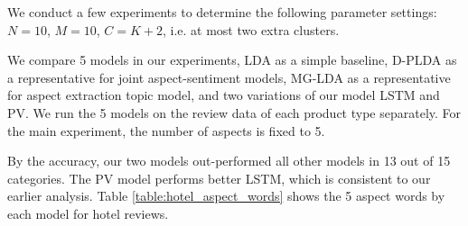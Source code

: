 \documentclass[10pt,final,conference,letterpaper]{IEEEtran}
\newcommand{\figref}[1]{Figure \ref{#1}}
\newcommand{\tabref}[1]{Table \ref{#1}}
\begin{document}
%
%
%
%
We conduct a few experiments to determine the following
parameter settings: $N=10$, $M=10$, $C=K+2$, i.e. at most two extra clusters.

We compare 5 models in our experiments, 
LDA as a simple baseline, 
D-PLDA \cite{moghaddam2012design} as a representative for joint 
aspect-sentiment models, MG-LDA \cite{titov2008modeling} as 
a representative for aspect extraction topic model,
and two variations of our model LSTM and PV. 
We run the 5 models on the review data of each product type separately. 
For the main experiment, the number of aspects is fixed to 5.

By the accuracy, our two models out-performed all other models in 13 out of 15 
categories. The PV model performs better LSTM, 
which is consistent to our earlier analysis. \tabref{table:hotel_aspect_words}
shows the 5 aspect words by each model for hotel reviews.
\end{document}
